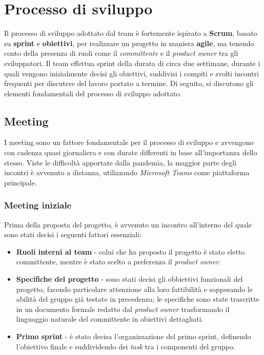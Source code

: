 \section{Processo di sviluppo}
\label{sec:development}
Il processo di sviluppo adottato dal team è fortemente ispirato a \textbf{Scrum},
basato su \textbf{sprint} e \textbf{obiettivi}, per realizzare un progetto in maniera \textbf{agile},
ma tenendo conto della presenza di ruoli come il \textit{committente} e il \textit{product owner} tra gli sviluppatori.
Il team effettua sprint della durata di circa due settimane, durante i quali vengono inizialmente decisi gli obiettivi,
suddivisi i compiti e svolti incontri frequenti per discutere del lavoro portato a termine.
Di seguito, si discutono gli elementi fondamentali del processo di sviluppo adottato.

\subsection{Meeting}
I meeting sono un fattore fondamentale per il processo di sviluppo e avvengono con cadenza quasi giornaliera e con durate differenti in base all'importanza dello stesso. Viste le difficoltà apportate dalla pandemia, la maggior parte degli incontri è avvenuto a distanza, utilizzando \textit{Microsoft Teams} come piattaforma principale.

\subsubsection{Meeting iniziale}
Prima della proposta del progetto, è avvenuto un incontro all'interno del quale sono stati decisi i seguenti fattori essenziali:
\begin{itemize}
    \item \textbf{Ruoli interni al team} - colui che ha proposto il progetto è stato eletto committente, mentre è stato scelto a preferenza il \textit{product owner}.
    \item \textbf{Specifiche del progetto} - sono stati decisi gli obbiettivi funzionali del progetto, facendo particolare attenzione alla loro fattibilità e soppesando le abilità del gruppo già testate in precedenza; le specifiche sono state trascritte in un documento formale redatto dal \textit{product owner} trasformando il linguaggio naturale del committente in obiettivi dettagliati.
    \item \textbf{Primo sprint} - è stato decisa l'organizzazione del primo sprint, definendo l'obiettivo finale e suddividendo dei \textit{task} tra i componenti del gruppo.
\end{itemize}

